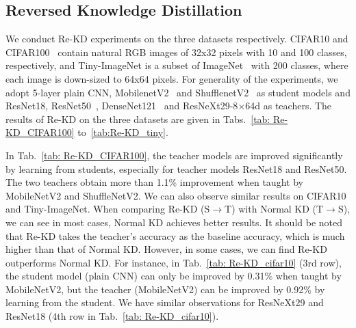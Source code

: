 \documentclass[10pt,twocolumn,letterpaper]{article}
\begin{document}
\subsection{Reversed Knowledge Distillation}
We conduct Re-KD experiments on the three datasets respectively. CIFAR10 and CIFAR100~\cite{krizhevsky2009learning} contain natural RGB images of 32x32 pixels with 10 and 100 classes, respectively, and Tiny-ImageNet is a subset of ImageNet~\cite{deng2009imagenet} with 200 classes, where each image is down-sized to 64x64 pixels. For generality of the experiments, we adopt 5-layer plain CNN, MobilenetV2~\cite{sandler2018mobilenetv2} and ShufflenetV2~\cite{ma2018shufflenet} as student models and ResNet18, ResNet50~\cite{he2016deep}, DenseNet121~\cite{huang2017densely} and ResNeXt29-8$\times$64d as teachers. The results of Re-KD on the three datasets are given in Tabs.~\ref{tab: Re-KD_CIFAR100} to~\ref{tab:Re-KD_tiny}.

In Tab.~\ref{tab: Re-KD_CIFAR100}, the teacher models are improved significantly by learning from students, especially for teacher models ResNet18 and ResNet50. The two teachers obtain more than 1.1\% improvement when taught by MobileNetV2 and ShuffleNetV2. We can also observe similar results on CIFAR10 and Tiny-ImageNet. 
When comparing Re-KD (S$\rightarrow$T) with Normal KD (T$\rightarrow$S), we can see in most cases, Normal KD achieves better results. It should be noted that Re-KD takes the teacher's accuracy as the baseline accuracy, which is much higher than that of Normal KD. However, in some cases, we can find Re-KD outperforms Normal KD. For instance, in Tab.~\ref{tab: Re-KD_cifar10} (3rd row), the student model (plain CNN) can only be improved by 0.31\% when taught by MobileNetV2, but the teacher (MobileNetV2) can be improved by 0.92\% by learning from the student. We have similar observations for ResNeXt29 and ResNet18 (4th row in Tab.~\ref{tab: Re-KD_cifar10}).
\end{document}
